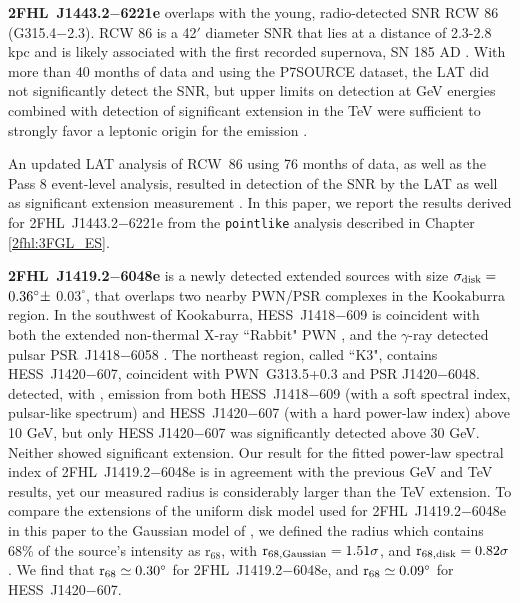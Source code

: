 {\bfseries 2FHL~J1443.2$-$6221e} overlaps with the young, radio-detected SNR RCW 86 (G315.4−2.3). RCW 86 is a 42$'$ diameter SNR that lies at a distance of 2.3-2.8 kpc and is likely associated with the first recorded supernova, SN 185 AD \citep{Rosado96,Sollerman03}. With more than 40 months of data and using the  P7SOURCE dataset, the LAT did not significantly detect the SNR, but upper limits on detection at GeV energies combined with detection of significant extension in the TeV \citep{Aharonian09} were sufficient to strongly favor a leptonic origin for the emission \citep{Lemoine-Goumard12}.

An updated LAT analysis of RCW~86 using 76 months of data, as well as the Pass 8 event-level analysis, resulted in detection of the SNR by the LAT as well as significant extension measurement \citep[the former published after \cite{2FHL}]{Ajello_rcw86,Hewitt15a}. In this paper, we report the results derived for 2FHL~J1443.2$-$6221e from the {\tt pointlike} analysis described in Chapter \ref{2fhl:3FGL_ES}.

{\bfseries 2FHL~J1419.2$-$6048e} is a newly detected extended sources with size
 ${\rm \sigma_{disk} =}$ ${\rm 0.36 ^{\circ} \pm}$ $0.03 ^{\circ}$, that overlaps two nearby PWN/PSR complexes in the Kookaburra region. In the southwest of Kookaburra, HESS~J1418$-$609 \citep{AharonianKook06} is coincident with both the extended non-thermal X-ray ``Rabbit" PWN \citep[G313.3+0.1,][]{Roberts99}, and the $\gamma$-ray detected pulsar PSR~J1418$-$6058 \citep{AbdoBlindPSR09}. The northeast region, called ``K3", contains HESS~J1420$-$607, coincident with PWN~G313.5+0.3 and PSR J1420$-$6048. \cite{Acero13} detected, with \lat, emission from both HESS~J1418$-$609 (with a soft spectral index, pulsar-like spectrum) and HESS~J1420$-$607 (with a hard power-law index) above 10 GeV, but only HESS J1420$-$607 was significantly detected above 30 GeV. Neither showed significant extension. Our result for the fitted power-law spectral index of 2FHL~J1419.2$-$6048e is in agreement with the previous GeV and TeV results, yet our measured radius is considerably larger than the TeV extension. To compare the extensions of the uniform disk model used for 2FHL~J1419.2$-$6048e in this paper to the Gaussian model of \cite{AharonianKook06}, we defined the radius which contains 68\% of the source's intensity as r$_{68}$, with ${\rm r_{68,Gaussian} = 1.51\sigma}$, and ${\rm r_{68,disk} = 0.82\sigma}$  \citep{Lande12}. We find that ${\rm r_{68} \simeq 0.30^{\circ}}$ for 2FHL~J1419.2$-$6048e, and ${\rm r_{68}} \simeq 0.09^{\circ}$ for HESS~J1420$-$607. 

